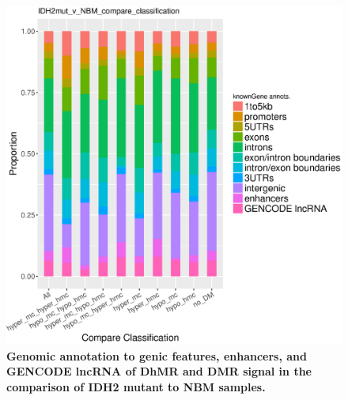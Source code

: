 \begin{figure}[ht!]
\centering
\includegraphics[width=1\textwidth]{chap5figs/figure5_16.eps}
\caption[Genomic annotation to genic features, enhancers, and GENCODE lncRNA of DhMR and DMR signal in the comparison of IDH2 mutant to NBM samples.]
{
\textbf{Genomic annotation to genic features, enhancers, and GENCODE lncRNA of DhMR and DMR signal in the comparison of IDH2 mutant to NBM samples.}
}
\label{chap5:fig:16}
\end{figure}

\newpage

